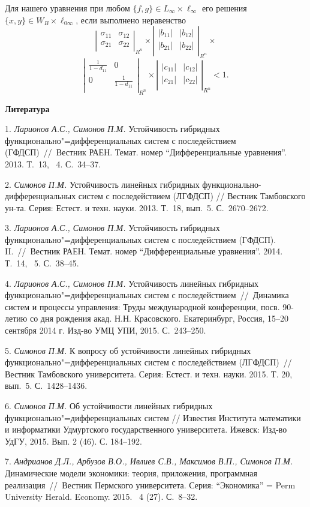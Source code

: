 Для нашего уравнения при любом $\{ f,g\} \in L_{\infty}\times \ell_{\infty}$ его решения $\{ x,y\} \in W_{B}\times \ell_{0\infty}$, если выполнено неравенство
$$
\left|\begin{array}{cc}
\sigma_{11} & \sigma_{12} \\
\sigma_{21} & \sigma_{22} \\
\end{array}\right|_{R^n} \times
\left|\begin{array}{cc}
|b_{11}| & |b_{12}| \\
|b_{21}| & |b_{22}| \\
\end{array}\right|_{R^n}\times
$$
$$
\left|\begin{array}{cc}
\frac{1}{1-d_{11}} & 0 \\
0 & \frac{1}{1-d_{11}} \\
\end{array}\right|_{R^n}\times
\left|\begin{array}{cc}
|c_{11}| & |c_{12}| \\
|c_{21}| & |c_{22}| \\
\end{array}\right|_{R^n} < 1.
$$


\smallskip \centerline {\bf Литература} \nopagebreak

1.
{\it Ларионов А.С., Симонов П.М.} Устойчивость гибридных функционально"=дифференциальных систем с последействием (ГФДСП)~//~Вестник РАЕН. Темат. номер ``Дифференциальные уравнения''. 2013. Т.~13, \No~4. С.~34--37.

2.
{\it Симонов П.М.}	Устойчивость линейных гибридных фу\-н\-к\-ци\-о\-на\-ль\-но-ди\-ф\-фе\-рен\-ци\-аль\-ных систем с последействием (ЛГФДСП) // Вестник Тамбовского ун-та. Серия: Естест. и техн. науки. 2013. Т.~18, вып.~5. С.~2670--2672.


3.
{\it Ларионов А.С., Симонов П.М.} Устойчивость гибридных функционально"=дифференциальных систем с последействием (ГФДСП). II.~//~Вестник РАЕН. Темат. номер ``Дифференциальные уравнения''. 2014. Т.~14, \No~5. С.~38--45.

4.
{\it Ларионов А.С., Симонов П.М.} Устойчивость линейных гибридных функционально"=дифференциальных систем с последействием~//~Динамика систем и процессы управления: Труды международной конференции, посв. 90-летию со дня рождения акад. Н.Н. Красовского. Екатеринбург, Россия, 15--20 сентября 2014 г. Изд-во УМЦ УПИ, 2015. С.~243--250.

5.
{\it Симонов П.М.} К вопросу об устойчивости линейных гибридных функционально"=дифференциальных систем с последействием (ЛГФДСП)~// Вестник Тамбовского университета. Серия: Естест. и техн. науки. 2015. Т. 20, вып.~5. С.~1428--1436.

6.
{\it Симонов П.М.} Об устойчивости линейных гибридных функционально"=дифференциальных систем // Известия Института математики и информатики Удмуртского государственного университета. Ижевск: Изд-во УдГУ, 2015. Вып. 2 (46). С. 184--192.


7.
{\it Андрианов Д.Л., Арбузов В.О., Ивлиев С.В., Максимов В.П., Симонов П.М.} Динамические модели экономики: теория, приложения, программная реализация~//~Вестник Пермского университета. Серия: ``Экономика'' = Perm University Herald. Economy. 2015. \No~4 (27). С.~8--32.
